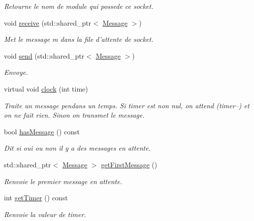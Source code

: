 \begin{DoxyCompactItemize}
\begin{DoxyCompactList}\small\item\em Retourne le nom de module qui possede ce socket. \end{DoxyCompactList}\item 
\hypertarget{classSocket_a9adf799b90c455f3a1f4151adb031fd0}{void \hyperlink{classSocket_a9adf799b90c455f3a1f4151adb031fd0}{receive} (std\-::shared\-\_\-ptr$<$ \hyperlink{classMessage}{Message} $>$)}\label{classSocket_a9adf799b90c455f3a1f4151adb031fd0}

\begin{DoxyCompactList}\small\item\em Met le message m dans la file d'attente de socket. \end{DoxyCompactList}\item 
void \hyperlink{classSocket_a06b687baf9b01f3e399a5ee040ca04e4}{send} (std\-::shared\-\_\-ptr$<$ \hyperlink{classMessage}{Message} $>$)
\begin{DoxyCompactList}\small\item\em Envoye. \end{DoxyCompactList}\item 
\hypertarget{classSocket_a6bd5bddfabd838a3388b445c21d3c41e}{virtual void \hyperlink{classSocket_a6bd5bddfabd838a3388b445c21d3c41e}{clock} (int time)}\label{classSocket_a6bd5bddfabd838a3388b445c21d3c41e}

\begin{DoxyCompactList}\small\item\em Traite un message pendans un temps. Si timer est non nul, on attend (timer--) et on ne fait rien. Sinon on transmet le message. \end{DoxyCompactList}\item 
\hypertarget{classSocket_a2f8e56f35ae03fa8dd0593814d2f1fa4}{bool \hyperlink{classSocket_a2f8e56f35ae03fa8dd0593814d2f1fa4}{has\-Message} () const }\label{classSocket_a2f8e56f35ae03fa8dd0593814d2f1fa4}

\begin{DoxyCompactList}\small\item\em Dit si oui ou non il y a des messages en attente. \end{DoxyCompactList}\item 
std\-::shared\-\_\-ptr$<$ \hyperlink{classMessage}{Message} $>$ \hyperlink{classSocket_a71e162a0ca00b1a46fe23eaccb09f76d}{get\-First\-Message} ()
\begin{DoxyCompactList}\small\item\em Renvoie le premier message en attente. \end{DoxyCompactList}\item 
\hypertarget{classSocket_aa890633022a29b56ed3844684d32e0fc}{int \hyperlink{classSocket_aa890633022a29b56ed3844684d32e0fc}{get\-Timer} () const }\label{classSocket_aa890633022a29b56ed3844684d32e0fc}

\begin{DoxyCompactList}\small\item\em Renvoie la valeur de timer. \end{DoxyCompactList}\end{DoxyCompactItemize}


